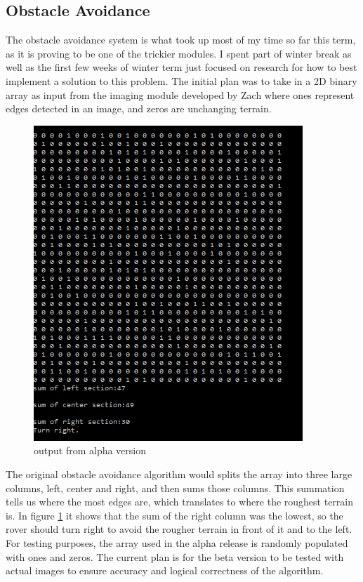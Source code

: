 \documentclass[10pt,letterpaper,onecolumn,draftclsnofoot,journal]{IEEEtran}
\begin{document}
\subsection{Obstacle Avoidance}
The obstacle avoidance system is what took up most of my time so far this term, as it is proving to be one of the trickier modules. I spent part of winter break as well as the first few weeks of winter term just focused on research for how to best implement a solution to this problem. The initial plan was to take in a 2D binary array as input from the imaging module developed by Zach where ones represent edges detected in an image, and zeros are unchanging terrain.
\begin{figure}[H]
	\centering
	\includegraphics[scale = .75]{obstacleavoidance.png}
	\caption{output from alpha version}
	\label{fig:obstacle}
\end{figure}
\par
The original obstacle avoidance algorithm would splits the array into three large columns, left, center and right, and then sums those columns. This summation tells us where the most edges are, which translates to where the roughest terrain is. In figure \ref{fig:obstacle} it shows that the sum of the right column was the lowest, so the rover should turn right to avoid the rougher terrain in front of it and to the left. For testing purposes, the array used in the alpha release is randomly populated with ones and zeros. The current plan is for the beta version to be tested with actual images to ensure accuracy and logical correctness of the algorithm.
\end{document}
